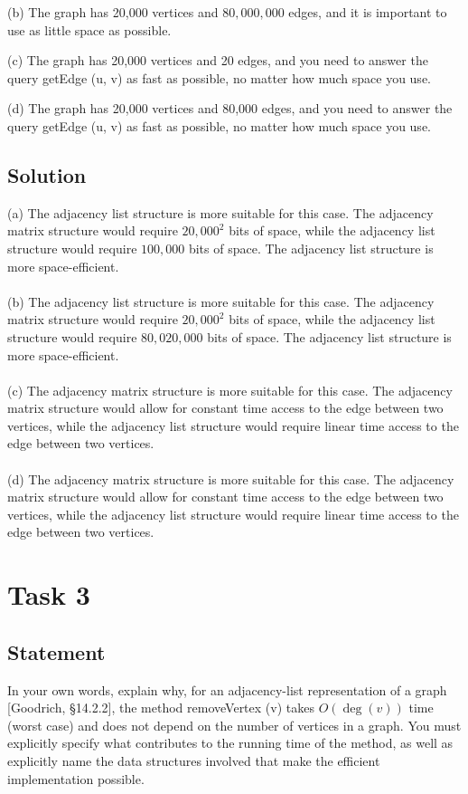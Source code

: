 \documentclass[10pt]{article}
\begin{document}
(b) The graph has 20,000 vertices and $80,000,000$ edges, and it is important to use as little space as possible.

(c) The graph has 20,000 vertices and 20 edges, and you need to answer the query getEdge (u, v) as fast as possible, no matter how much space you use.

(d) The graph has 20,000 vertices and 80,000 edges, and you need to answer the query getEdge (u, v) as fast as possible, no matter how much space you use.

\subsection{Solution}

(a) The adjacency list structure is more suitable for this case. The adjacency matrix structure would require $20,000^2$ bits of space, while the adjacency list structure would require $100,000$ bits of space. The adjacency list structure is more space-efficient. \\ \\
(b) The adjacency list structure is more suitable for this case. The adjacency matrix structure would require $20,000^2$ bits of space, while the adjacency list structure would require $80,020,000$ bits of space. The adjacency list structure is more space-efficient. \\ \\
(c) The adjacency matrix structure is more suitable for this case. The adjacency matrix structure would allow for constant time access to the edge between two vertices, while the adjacency list structure would require linear time access to the edge between two vertices. \\ \\
(d) The adjacency matrix structure is more suitable for this case. The adjacency matrix structure would allow for constant time access to the edge between two vertices, while the adjacency list structure would require linear time access to the edge between two vertices.

\section{Task 3}
\subsection{Statement}

In your own words, explain why, for an adjacency-list representation of a graph [Goodrich, §14.2.2], the method removeVertex (v) takes $O(\operatorname{deg}(v))$ time (worst case) and does not depend on the number of vertices in a graph. You must explicitly specify what contributes to the running time of the method, as well as explicitly name the data structures involved that make the efficient implementation possible.
\end{document}
